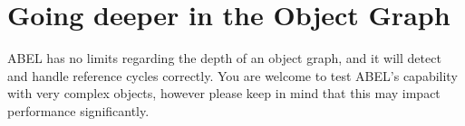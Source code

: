 \documentclass[a4paper,12pt]{report}
\begin{document}
\section{Going deeper in the Object Graph}
\label{sec:going_deeper_in_object_graph}
ABEL has no limits regarding the depth of an object graph, and it will detect and handle reference cycles correctly. 
You are welcome to test ABEL's capability with very complex objects, however please keep in mind that this may impact performance significantly.


%
%
%
%
%
%	
%
%
%
%
%
%
%
\end{document}
